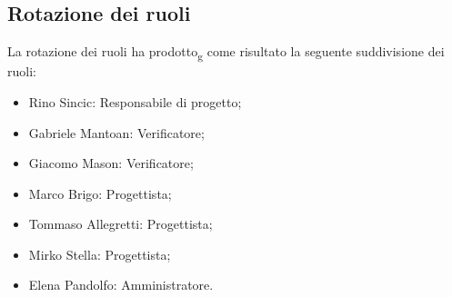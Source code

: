 \subsection{Rotazione dei ruoli}
La rotazione dei ruoli ha prodotto\textsubscript{g} come risultato la seguente suddivisione dei ruoli:
\begin{itemize}
        \item Rino Sincic: Responsabile di progetto;
	\item Gabriele Mantoan: Verificatore;
	\item Giacomo Mason: Verificatore;
	\item Marco Brigo: Progettista;
	\item Tommaso Allegretti: Progettista;
	\item Mirko Stella: Progettista;
	\item Elena Pandolfo: Amministratore.
\end{itemize}
